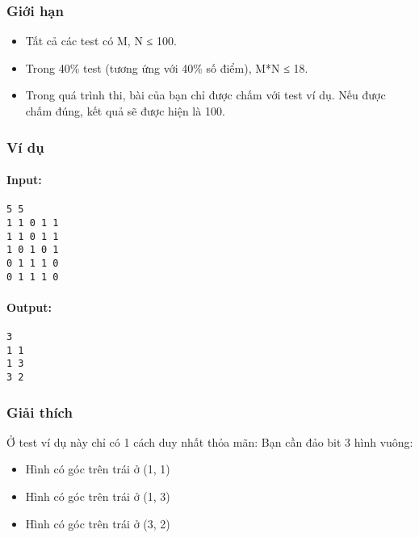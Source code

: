\subsubsection{   Giới hạn  }
\begin{itemize}
	\item      Tất cả các test có M, N           ≤          100.    
	\item      Trong 40\% test (tương ứng với 40\% số điểm), M*N           ≤          18.    
	\item     Trong quá trình thi, bài của bạn chỉ được chấm với test ví dụ. Nếu được chấm đúng, kết quả sẽ được hiện là 100.   
\end{itemize}

\subsubsection{    Ví dụ   }

\paragraph{    Input:   }
\begin{verbatim}
5 5
1 1 0 1 1
1 1 0 1 1
1 0 1 0 1
0 1 1 1 0
0 1 1 1 0\end{verbatim}

\paragraph{\textbf{    Output:   }}
\begin{verbatim}
3
1 1
1 3
3 2\end{verbatim}

\subsubsection{   Giải thích  }

   Ở test ví dụ này chỉ có 1 cách duy nhất thỏa mãn: Bạn cần đảo bit 3 hình vuông:  
\begin{itemize}
	\item     Hình có góc trên trái ở (1, 1)   
	\item     Hình có góc trên trái ở (1, 3)   
	\item     Hình có góc trên trái ở (3, 2)   
\end{itemize}